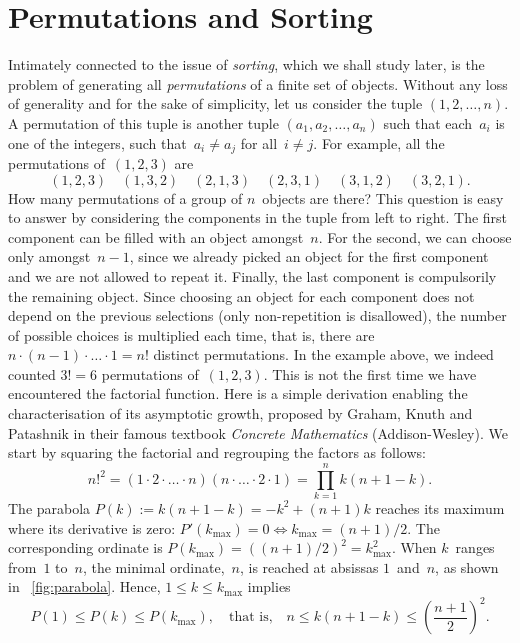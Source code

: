 
\chapter{Permutations and Sorting}
\label{permutations}

Intimately connected to the issue of \emph{sorting}, which we shall
study later, is the problem of generating all \emph{permutations} of a
finite set of objects. Without any loss of generality and for the sake
of simplicity, let us consider the tuple \((1,2,\dots,n)\). A
permutation of this tuple is another tuple \((a_1,a_2,\dots,a_n)\)
such that each~\(a_i\) is one of the integers, such that~\(a_i \neq
a_j\) for all~\(i \neq j\). For example, all the permutations
of~\((1,2,3)\) are
\[
(1,2,3) \quad (1,3,2) \quad (2,1,3) \quad (2,3,1) \quad (3,1,2) \quad
(3,2,1).
\]
How many permutations of a group of \(n\)~objects are there? This
question is easy to answer by considering the components in the tuple
from left to right. The first component can be filled with an object
amongst~\(n\). For the second, we can choose only amongst~\(n-1\),
since we already picked an object for the first component and we are
not allowed to repeat it. Finally, the last component is compulsorily
the remaining object. Since choosing an object for each component does
not depend on the previous selections (only non\hyp{}repetition is
disallowed), the number of possible choices is multiplied each time,
that is, there are \(n \cdot (n-1) \cdot \ldots \cdot 1 = n!\)
distinct permutations. In the example above, we indeed counted \(3! =
6\) permutations of~\((1,2,3)\). This is not the first time we have
encountered the factorial function. Here is a simple derivation
enabling the characterisation of its asymptotic growth, proposed by
Graham, Knuth and Patashnik in their famous textbook \emph{Concrete
  Mathematics} (Addison\hyp{}Wesley). We start by squaring the
factorial and regrouping the factors as follows:
\[
n!^2 = (1 \cdot 2 \cdot \ldots \cdot n)
       (n \cdot \ldots \cdot 2 \cdot 1)
     = \prod_{k=1}^{n}{k(n+1-k)}.
\]
The parabola \(P(k) := k(n+1-k) = -k^2 + (n+1)k\) reaches its maximum
where its derivative is zero: \(P'(k_{\max}) = 0 \Leftrightarrow
k_{\max}=(n+1)/2\). The corresponding ordinate is \(P(k_{\max}) =
((n+1)/2)^2 = k_{\max}^2\). When \(k\)~ranges from~\(1\) to~\(n\), the
minimal ordinate,~\(n\), is reached at absissas \(1\)~and~\(n\), as
shown in \fig~\vref{fig:parabola}. Hence, \(1 \leqslant k \leqslant
k_{\max}\) implies
\[
P(1) \leqslant P(k) \leqslant P(k_{\max}),\quad \text{that is,} \quad
n \leqslant k(n+1-k) \leqslant \left(\frac{n+1}{2}\right)^2.
\]
